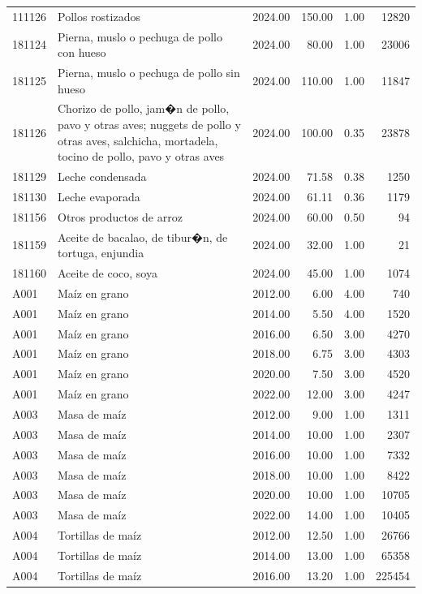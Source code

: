 \begin{table}[ht]
\begin{tabular}{llrrrr}
  111126 & Pollos rostizados & 2024.00 & 150.00 & 1.00 & 12820 \\ 
  181124 & Pierna, muslo o pechuga de pollo con hueso & 2024.00 & 80.00 & 1.00 & 23006 \\ 
  181125 & Pierna, muslo o pechuga de pollo sin hueso & 2024.00 & 110.00 & 1.00 & 11847 \\ 
  181126 & Chorizo de pollo, jam�n de pollo, pavo y otras aves; nuggets de pollo y otras aves, salchicha, mortadela, tocino de pollo, pavo y otras aves & 2024.00 & 100.00 & 0.35 & 23878 \\ 
  181129 & Leche condensada & 2024.00 & 71.58 & 0.38 & 1250 \\ 
  181130 & Leche evaporada & 2024.00 & 61.11 & 0.36 & 1179 \\ 
  181156 & Otros productos de arroz & 2024.00 & 60.00 & 0.50 &  94 \\ 
  181159 & Aceite de bacalao, de tibur�n, de tortuga, enjundia & 2024.00 & 32.00 & 1.00 &  21 \\ 
  181160 & Aceite de coco, soya & 2024.00 & 45.00 & 1.00 & 1074 \\ 
  A001 & Maíz en grano & 2012.00 & 6.00 & 4.00 & 740 \\ 
  A001 & Maíz en grano & 2014.00 & 5.50 & 4.00 & 1520 \\ 
  A001 & Maíz en grano & 2016.00 & 6.50 & 3.00 & 4270 \\ 
  A001 & Maíz en grano & 2018.00 & 6.75 & 3.00 & 4303 \\ 
  A001 & Maíz en grano & 2020.00 & 7.50 & 3.00 & 4520 \\ 
  A001 & Maíz en grano & 2022.00 & 12.00 & 3.00 & 4247 \\ 
  A003 & Masa de maíz & 2012.00 & 9.00 & 1.00 & 1311 \\ 
  A003 & Masa de maíz & 2014.00 & 10.00 & 1.00 & 2307 \\ 
  A003 & Masa de maíz & 2016.00 & 10.00 & 1.00 & 7332 \\ 
  A003 & Masa de maíz & 2018.00 & 10.00 & 1.00 & 8422 \\ 
  A003 & Masa de maíz & 2020.00 & 10.00 & 1.00 & 10705 \\ 
  A003 & Masa de maíz & 2022.00 & 14.00 & 1.00 & 10405 \\ 
  A004 & Tortillas de maíz & 2012.00 & 12.50 & 1.00 & 26766 \\ 
  A004 & Tortillas de maíz & 2014.00 & 13.00 & 1.00 & 65358 \\ 
  A004 & Tortillas de maíz & 2016.00 & 13.20 & 1.00 & 225454 \\ 

\end{tabular}
\end{table}

